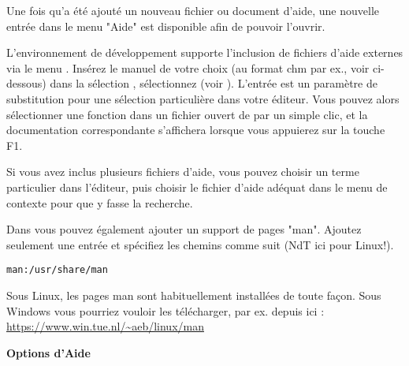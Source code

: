 Une fois qu'a été ajouté un nouveau fichier ou document d'aide, une nouvelle entrée dans le menu "Aide" est disponible afin de pouvoir l'ouvrir.

L'environnement de développement \codeblocks supporte l'inclusion de fichiers d'aide externes via le menu . Insérez le manuel de votre choix (au format chm par ex., voir ci-dessous) dans la sélection , sélectionnez  (voir ). L'entrée  est un paramètre de substitution pour une sélection particulière dans votre éditeur. Vous pouvez alors sélectionner une fonction dans un fichier ouvert de \codeblocks par un simple clic, et la documentation correspondante s'affichera lorsque vous appuierez sur la touche F1.

Si vous avez inclus plusieurs fichiers d'aide, vous pouvez choisir un terme particulier dans l'éditeur, puis choisir le fichier d'aide adéquat dans le menu de contexte  pour que \codeblocks y fasse la recherche.


Dans \codeblocks vous pouvez également ajouter un support de pages "man". Ajoutez seulement une entrée  et spécifiez les chemins comme suit (NdT ici pour Linux!).

\begin{lstlisting}
man:/usr/share/man
\end{lstlisting}

Sous Linux, les pages man sont habituellement installées de toute façon. Sous Windows vous pourriez vouloir les télécharger, par ex. depuis ici : \url{https://www.win.tue.nl/~aeb/linux/man}

\textbf{Options d'Aide}

